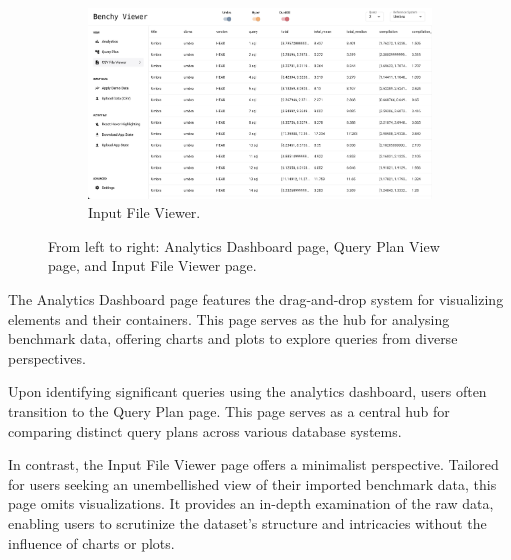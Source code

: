\begin{figure}[h]
\begin{subfigure}[b]{0.3\linewidth}
      \label{fig:app-query-plan}
  \end{subfigure}
  \hspace{0.5cm} %
  \begin{subfigure}[b]{0.3\linewidth}
    \includegraphics[width=\linewidth]{figures/app-data-viewer.png}
    \caption{Input File Viewer.}
      \label{fig:app-data-viewer}
  \end{subfigure}
  \caption{From left to right: Analytics Dashboard page, Query Plan View page, and Input File Viewer page.}
  \label{fig:pages}
\end{figure}

The Analytics Dashboard page features the drag-and-drop system for visualizing elements and their containers. This page serves as the hub for analysing benchmark data, offering charts and plots to explore queries from diverse perspectives.

Upon identifying significant queries using the analytics dashboard, users often transition to the Query Plan page. This page serves as a central hub for comparing distinct query plans across various database systems. 

In contrast, the Input File Viewer page offers a minimalist perspective. Tailored for users seeking an unembellished view of their imported benchmark data, this page omits visualizations. It provides an in-depth examination of the raw data, enabling users to scrutinize the dataset's structure and intricacies without the influence of charts or plots.















